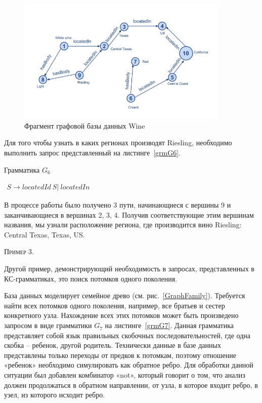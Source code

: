 \begin{figure}
 \centering
 \includegraphics[width=0.9\textwidth]{Smolina/pics/GraphWine.png}
 \caption{Фрагмент графовой базы данных Wine}
 \label{GraphWine}
\end{figure}

Для того чтобы узнать в каких регионах производят Riesling, необходимо выполнить запрос представленный на листинге~\ref{grmG6}. 

\begin{listing}
\caption{Грамматика $G_6$}
\label{grmG6}
\centering
$\begin{array}{rl}
S \rightarrow locatedId \ S | \ locatedIn
\end{array}$
 \end{listing}

В процессе работы было получено 3 пути, начинающиеся с вершины 9 и заканчивающиеся в вершинах 2, 3, 4. Получив соответствующие этим вершинам названия, мы узнали расположение региона, где производится вино Riesling: Central Texas, Texas, US.
 
 \textsc{Пример 3.}

 Другой пример, демонстрирующий необходимость в запросах, представленных в КС-грамматиках, это поиск потомков одного
поколения.

База данных моделирует семейное древо (см. рис.~\ref{GraphFamily}). Требуется найти всех потомков одного поколения, например, все братьев и сестер конкретного узла. Нахождение всех этих потомков может быть произведено запросом в виде грамматики $G_7$ на листинге~\ref{grmG7}. Данная грамматика представляет собой язык правильных скобочных последовательностей, где одна скобка – ребенок, другой родитель. Технически данные в базе данных представлены только переходы от предков к потомкам, поэтому отношение «ребенок» необходимо симулировать как обратное ребро. Для обработки данной ситуации был добавлен комбинатор «not», который говорит о том, что анализ должен продолжаться в обратном направлении, от узла, в которое входит ребро, в узел, из которого исходит ребро.

